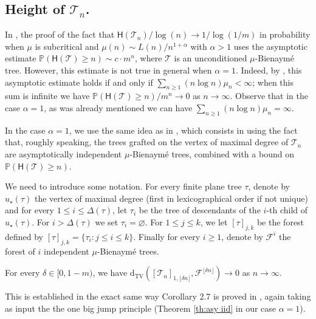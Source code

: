 \documentclass[a4paper,11pt]{article}
\DeclareRobustCommand{\P}{\mathbb{P}}
\DeclareRobustCommand{\dtv}{\mathrm{d}_{\mathrm{TV}}}
\begin{document}
\subsection{Height of $\mathcal{T}_{n}$.} In  \cite{Kortchemski_2013}, the proof of the fact that $\mathsf{H}(\mathcal{T}_{n})/ \log(n) \rightarrow 1/\log(1/m)$ in probability when $\mu$ is subcritical and $\mu(n) \sim L(n)/n^{1+\alpha}$ with $\alpha>1$ uses the asymptotic estimate $\P( \mathsf{H}( \mathcal{T}) \geq n) \sim c \cdot m^{n}$, where $ \mathcal{T}$ is an unconditioned $\mu$-Bienaymé tree. However, this estimate is not true in general when $\alpha=1$. Indeed, by \cite[Theorem 2]{HSV67}, this asymptotic estimate holds if and only if $\sum_{n \geq 1} ( n \log n) \mu_n <\infty$; when this sum is infinite we have $\P( \mathsf{H}( \mathcal{T}) \geq n) /m^{n} \rightarrow 0$ as $n \rightarrow \infty$. Observe that in the case $\alpha=1$, as was already mentioned we can have $\sum_{n \geq 1} ( n \log n) \mu_{n} =\infty$.

In the case $\alpha=1$, we use the same idea as in \cite{Kortchemski_2013}, which consists in using the fact that, roughly speaking, the trees grafted on the vertex of maximal degree of $ \mathcal{T}_{n}$ are asymptotically independent $\mu$-Bienaymé trees, combined with a bound on $\P( \mathsf{H}( \mathcal{T}) \geq n)$.

We need to introduce some notation. For every finite plane tree $\tau$, denote by $u_{\star}(\tau)$ the vertex of maximal degree (first in lexicographical order if not unique) and for every $1 \leq i \leq \Delta(\tau)$, let $\tau_{i}$ be the tree of descendants of the $i$-th child of $u_{\star}(\tau)$. For $i > \Delta(\tau)$ we set $\tau_{i}=\varnothing$. For $1 \leq j \leq k$, we let $ [\tau]_{j,k}$ be the forest defined by $[\tau]_{j,k}= \{\tau_{i} : j \leq i \leq k \}$. Finally for every $i \geq 1$, denote by $\mathcal{F}^{ i}$ the forest of $i$ independent $\mu$-Bienaymé trees.


\begin{proposition}
\label{prop:forests}For every $\delta \in [0,1-m)$, we have
$\dtv \left(  \left[  \mathcal{T}_{n}  \right]_{1,\lfloor \delta n\rfloor}, \mathcal{F}^{ \lfloor \delta n\rfloor}  \right) \rightarrow 0$ as $n \rightarrow \infty$.
\end{proposition}

This is established in the exact same way Corollary 2.7 is proved in  \cite{Kortchemski_2013},  again taking as input the the one big jump principle (Theorem \ref{th:asy iid} in our case $\alpha=1$).
\end{document}
